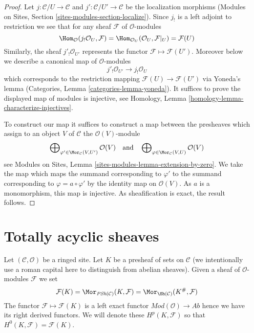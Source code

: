 \begin{proof}
Let $j : \mathcal{C}/U \to \mathcal{C}$ and
$j' : \mathcal{C}/U' \to \mathcal{C}$ be the localization morphisms
(Modules on Sites, Section \ref{sites-modules-section-localize}).
Since $j_!$ is a left adjoint to restriction we see that
for any sheaf $\mathcal{F}$ of $\mathcal{O}$-modules
$$
\Hom_\mathcal{O}(j_!\mathcal{O}_U, \mathcal{F})
=
\Hom_{\mathcal{O}_U}(\mathcal{O}_U, \mathcal{F}|_U)
=
\mathcal{F}(U)
$$
Similarly, the sheaf $j'_!\mathcal{O}_{U'}$ represents the
functor $\mathcal{F} \mapsto \mathcal{F}(U')$.
Moreover below we describe a canonical map of $\mathcal{O}$-modules
$$
j'_!\mathcal{O}_{U'} \longrightarrow j_!\mathcal{O}_U
$$
which corresponds to the restriction mapping
$\mathcal{F}(U) \to \mathcal{F}(U')$ via Yoneda's lemma
(Categories, Lemma \ref{categories-lemma-yoneda}).
It suffices to prove the displayed map of modules is injective, see
Homology, Lemma \ref{homology-lemma-characterize-injectives}.

\medskip\noindent
To construct our map it suffices to construct a map between the
presheaves which assign to an object $V$ of $\mathcal{C}$ the
$\mathcal{O}(V)$-module
$$
\bigoplus\nolimits_{\varphi' \in \Mor_\mathcal{C}(V, U')} \mathcal{O}(V)
\quad\text{and}\quad
\bigoplus\nolimits_{\varphi \in \Mor_\mathcal{C}(V, U)} \mathcal{O}(V)
$$
see Modules on Sites, Lemma \ref{sites-modules-lemma-extension-by-zero}.
We take the map which maps the summand corresponding to $\varphi'$
to the summand corresponding to $\varphi = a \circ \varphi'$
by the identity map on $\mathcal{O}(V)$. As $a$ is a monomorphism,
this map is injective. As sheafification is exact, the result
follows.
\end{proof}






\section{Totally acyclic sheaves}
\label{section-limp}

\noindent
Let $(\mathcal{C}, \mathcal{O})$ be a ringed site.
Let $K$ be a presheaf of sets on $\mathcal{C}$ (we intentionally use a
roman capital here to distinguish from abelian sheaves).
Given a sheaf of $\mathcal{O}$-modules $\mathcal{F}$ we set
$$
\mathcal{F}(K) =
\Mor_{\textit{PSh}(\mathcal{C})}(K, \mathcal{F}) =
\Mor_{\Sh(\mathcal{C})}(K^\#, \mathcal{F})
$$
The functor $\mathcal{F} \mapsto \mathcal{F}(K)$ is a left exact functor
$\textit{Mod}(\mathcal{O}) \to \textit{Ab}$ hence we have its
right derived functors. We will denote these $H^p(K, \mathcal{F})$
so that $H^0(K, \mathcal{F}) = \mathcal{F}(K)$.

